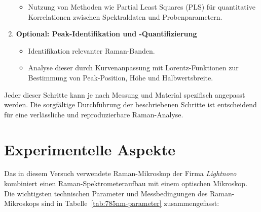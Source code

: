 \begin{enumerate}
\begin{itemize}
        \item Nutzung von Methoden wie Partial Least Squares (PLS) für quantitative Korrelationen zwischen Spektraldaten und Probenparametern.
    \end{itemize}
        \item \textbf{Optional: Peak-Identifikation und -Quantifizierung}
    \begin{itemize}
        \item Identifikation relevanter Raman-Banden.
        \item Analyse dieser durch Kurvenanpassung mit Lorentz-Funktionen zur Bestimmung von Peak-Position, Höhe und Halbwertsbreite.
    \end{itemize}
    
\end{enumerate}

Jeder dieser Schritte kann je nach Messung und Material spezifisch angepasst werden. Die sorgfältige Durchführung der beschriebenen Schritte ist entscheidend für 
eine verlässliche und reproduzierbare Raman-Analyse.

\section{Experimentelle Aspekte}\label{sec:experiment}
Das in diesem Versuch verwendete Raman-Mikroskop der Firma \textit{Lightnovo} kombiniert einen Raman-Spektrometeraufbau mit einem optischen Mikroskop.
Die wichtigsten technischen Parameter und Messbedingungen des Raman-Mikroskops sind in Tabelle~\ref{tab:785nm-parameter} zusammengefasst:

